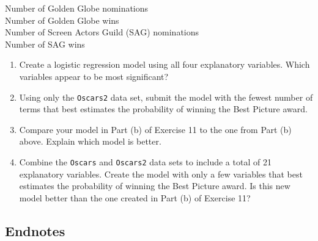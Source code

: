 \documentclass[
]{book}
\begin{document}
\begin{enumerate}
Number of Golden Globe nominations \\
Number of Golden Globe wins \\
Number of Screen Actors Guild (SAG) nominations \\
Number of SAG wins

  \begin{enumerate}
    \item Create a logistic regression model using all four explanatory variables. Which variables appear to be most significant?
    \item Using only the \texttt{Oscars2} data set, submit the model with the fewest number of terms that best estimates the probability of winning the Best Picture award.
    \item Compare your model in Part (b) of Exercise 11 to the one from Part (b) above. Explain which model is better.
    \item Combine the \texttt{Oscars} and \texttt{Oscars2} data sets to include a total of 21 explanatory variables. Create the model with only a few variables that best estimates the probability of winning the Best Picture award. Is this new model better than the one created in Part (b) of Exercise 11?
  \end{enumerate}

\end{enumerate}

\hypertarget{endnotes-4}{%
\subsection*{Endnotes}\label{endnotes-4}}
\end{document}
